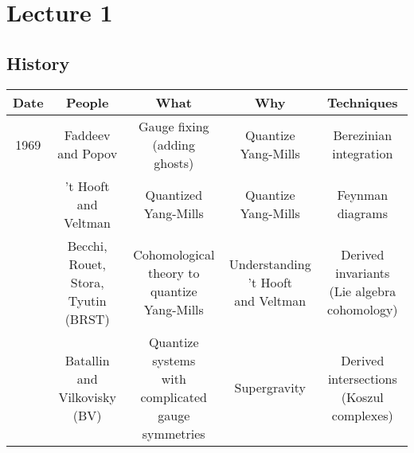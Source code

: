 \chapter{Lecture 1}

\section{History}

\begin{center}
  \begin{tabular}{ccccc}
    Date & People & What & Why & Techniques \\
    \midrule
    1969 &
    \makecell{ Faddeev \\ and Popov } &
    \makecell{ Gauge fixing \\ (adding ghosts) } &
    \makecell{ Quantize \\ Yang-Mills } &
    \makecell{ Berezinian \\ integration } \\
    \addlinespace
    1973 & 
    \makecell{ 't Hooft and \\ Veltman } &
    \makecell{ Quantized \\ Yang-Mills } &
    \makecell{ Quantize \\ Yang-Mills } &
    \makecell{ Feynman \\ diagrams } \\
    \addlinespace
    1975 &
    \makecell{ Becchi, Rouet, \\ Stora, Tyutin \\ (BRST) } &
    \makecell{ Cohomological \\ theory to quantize \\ Yang-Mills } &
    \makecell{ Understanding \\ 't Hooft \\ and Veltman } &
    \makecell{ Derived invariants \\ (Lie algebra \\ cohomology) } \\
    \addlinespace
    1981 &
    \makecell{ Batallin and \\ Vilkovisky \\ (BV) } &
    \makecell{ Quantize systems \\ with complicated \\ gauge symmetries } &
    Supergravity &
    \makecell{ Derived \\ intersections \\ (Koszul complexes) } \\

\end{tabular}
\end{center}
